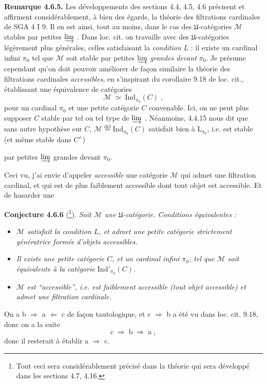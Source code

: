 \documentclass[11pt]{article}
\newcommand{\printedpage}[1]{\marginpar{\footnotesize p.~#1}}
\newcommand{\msp}[1]{\marginpar{\footnotesize [#1]}}
\newcommand{\Mc}{\mathcal{M}}
\newcommand{\U}{\mathfrak{U}}
\begin{document}
\msp{page 153}

\textbf{Remarque 4.6.5.} Les développements des sections 4.4, 4.5, 4.6 précisent et affirment considérablement, à bien des égards, la théorie des filtrations cardinales de SGA 4 I 9. Il en est ainsi, tout au moins, dans le cas des $\U$-catégories $\Mc$ stables par petites $\varinjlim$ . Dans loc. cit. on travaille avec des $\U$-catégories légèrement plus générales, celles satisfaisant
\printedpage{50}
la \textit{condition} $L$ : il existe un cardinal infini $\pi_0$ tel que $\Mc$ soit stable par petites $\varinjlim$ \textit{grandes devant} $\pi_0$. Je présume cependant qu'on doit pouvoir améliorer de façon similaire la théorie des filtrations cardinales \textit{accessibles}, en s'inspirant du corollaire 9.18 de loc. cit., établissant une équivalence de catégories
\[
\Mc \;\simeq\; \mathrm{Ind}_{\pi_0}(C)\;,
\]
pour un cardinal $\pi_0$ et une petite catégorie $C$ convenable. Ici, on ne peut plus supposer $C$ stable par tel ou tel type de $\varinjlim$ . Néanmoins, 4.4.15 nous dit que sans autre hypothèse sur $C$, $\Mc \overset{\text{déf}}{=} \mathrm{Ind}_{\pi_0}(C)$ satisfait bien à $\mathrm{L}_{\pi_0}$, i.e. est stable (et même stable dans $C^{\wedge}$)

\msp{page 154}

par petites $\varinjlim$ grandes devant $\pi_0$.

Ceci vu, j'ai envie d'appeler \textit{accessible} une catégorie $\Mc$ qui admet une filtration cardinal, et qui est de plus faiblement accessible dont tout objet est accessible. Et de hasarder une %

\textbf{Conjecture 4.6.6} (\footnote[61]{Tout ceci sera considérablement précisé dans la théorie qui sera développé dans les sections 4.7, 4.16.}). \textit{Soit $\Mc$ une $\U$-catégorie. Conditions équivalentes :} %
\begin{itemize}[leftmargin=4em]
\item[\textit{a)}] \textit{$\Mc$ satisfait la condition $L$, et admet une petite catégorie strictement génératrice formée d'objets accessibles.}
\item[\llap{$\Uparrow$\ }\textit{b)}] \textit{Il existe une petite catégorie $C$, et un cardinal infini $\pi_0$, tel que $\Mc$ soit équivalente à la catégorie $\mathrm{Ind}'_{\pi_0}(C)$.}
\item[\llap{$\Uparrow$\ }\textit{c)}] \textit{$\Mc$ est “accessible”, i.e. est faiblement accessible (tout objet accessible) et admet une filtration cardinale.}
\end{itemize}
On a b $\Longrightarrow$ a $\Longleftarrow$ c de façon tautologique, et c $\Longrightarrow$ b a été vu dans loc. cit. 9.18, donc on a la suite
\[
\mathrm{c} \;\Longrightarrow\; \mathrm{b} \;\Longrightarrow\; \mathrm{a}\;,
\]
donc il resterait à établir a $\Longrightarrow$ c.
\end{document}
